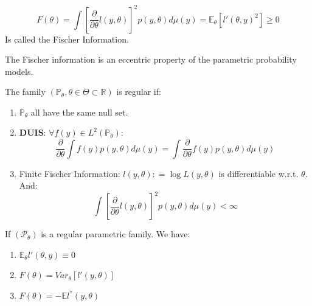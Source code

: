 \begin{definition}
\begin{equation*}
	F(\theta) = \int [\frac{\partial}{\partial \theta} l(y, \theta)]^2 p(y, \theta) d\mu(y) = \mathbb{E}_\theta [l'(\theta, y)^2] \geq 0
\end{equation*}
Is called the Fischer Information.
\end{definition}

\begin{remark}
	The Fischer information is an eccentric property of the parametric probability models. 
\end{remark}

\begin{definition}
The family $(\mathbb{P}_\theta, \theta \in \Theta \subset \mathbb{R})$ is regular if:
\begin{enumerate}
	\item $\mathbb{P}_{\theta}$ all have the same null set.
	\item \textbf{DUIS}: $\forall f(y) \in L^2(\mathbb{P_\theta})$:
	\begin{equation} \label{RM}
		\frac{\partial}{\partial \theta} \int f(y) p(y, \theta) d\mu(y) = \int \frac{\partial}{\partial \theta} f(y) p(y, \theta) d\mu(y) 
	\end{equation}
	\item Finite Fischer Information: $l(y, \theta): = \log L(y,\theta)$ is differentiable w.r.t. $\theta$. And:
	\begin{equation*}
		\int [\frac{\partial}{\partial \theta} l(y, \theta)]^2 p(y, \theta) d\mu(y) < \infty
	\end{equation*}	
\end{enumerate}
\end{definition}

\begin{lemma}
	If $(\mathcal{P}_\theta)$ is a regular parametric family. We have:
	\begin{enumerate}
		\item $\mathbb{E}_\theta l'(\theta, y) \equiv 0$
		\item $F(\theta) = Var_\theta[l'(y,\theta)]$
		\item $F(\theta) = -\mathbb{E}l^{''}(y, \theta)$
	\end{enumerate}
\end{lemma}

